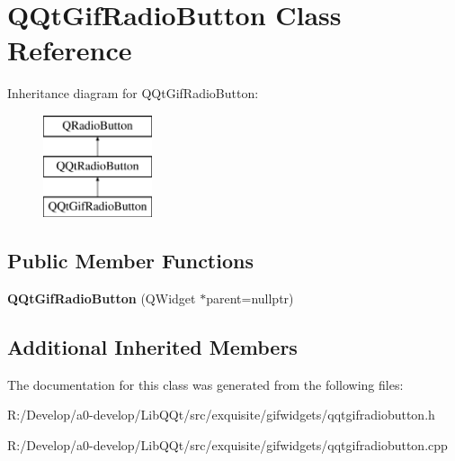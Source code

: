 \hypertarget{class_q_qt_gif_radio_button}{}\section{Q\+Qt\+Gif\+Radio\+Button Class Reference}
\label{class_q_qt_gif_radio_button}
Inheritance diagram for Q\+Qt\+Gif\+Radio\+Button\+:\begin{figure}[H]
\begin{center}
\leavevmode
\includegraphics[height=3.000000cm]{class_q_qt_gif_radio_button}
\end{center}
\end{figure}
\subsection*{Public Member Functions}
\begin{DoxyCompactItemize}
\item 
\mbox{\label{class_q_qt_gif_radio_button_a86cd3a833c395931f898f944094f8760}} 
{\bfseries Q\+Qt\+Gif\+Radio\+Button} (Q\+Widget $\ast$parent=nullptr)
\end{DoxyCompactItemize}
\subsection*{Additional Inherited Members}


The documentation for this class was generated from the following files\+:\begin{DoxyCompactItemize}
\item 
R\+:/\+Develop/a0-\/develop/\+Lib\+Q\+Qt/src/exquisite/gifwidgets/qqtgifradiobutton.\+h\item 
R\+:/\+Develop/a0-\/develop/\+Lib\+Q\+Qt/src/exquisite/gifwidgets/qqtgifradiobutton.\+cpp\end{DoxyCompactItemize}
